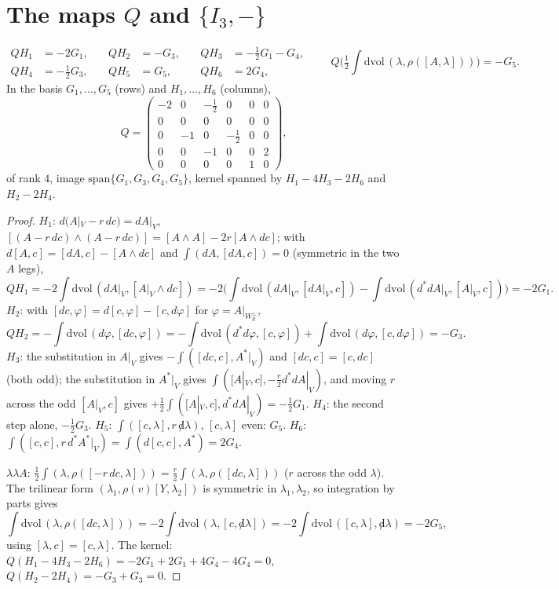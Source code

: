 \section{The maps $Q$ and $\{I_3,-\}$}

\begin{proposition}
\label{prop:s2c-QH}
\[
\begin{aligned}
QH_1&=-2G_1,&\quad QH_2&=-G_3,&\quad QH_3&=-\tfrac12G_1-G_4,\\
QH_4&=-\tfrac12G_3,&\quad QH_5&=G_5,&\quad QH_6&=2G_4,
\end{aligned}
\qquad
Q\Big(\tfrac12\int\mathrm{dvol}\,(\lambda,\rho([A,\lambda]))\Big)=-G_5 .
\]
In the basis $G_1,\dots,G_5$ (rows) and $H_1,\dots,H_6$ (columns),
\[
Q=\begin{pmatrix}-2&0&-\tfrac12&0&0&0\\0&0&0&0&0&0\\0&-1&0&-\tfrac12&0&0\\0&0&-1&0&0&2\\0&0&0&0&1&0\end{pmatrix},
\]
of rank $4$, image $\mathrm{span}\{G_1,G_3,G_4,G_5\}$, kernel spanned by $H_1-4H_3-2H_6$ and $H_2-2H_4$.
\end{proposition}

\begin{proof}
$H_1$: $d(A|_V-r\,dc)=dA|_V$, $[(A-r\,dc)\wedge(A-r\,dc)]=[A\wedge A]-2r[A\wedge dc]$; with $d[A,c]=[dA,c]-[A\wedge dc]$ and $\int(dA,[dA,c])=0$ (symmetric in the two $A$ legs),
\[
QH_1=-2\int\mathrm{dvol}\,(dA|_V,[A|_V\wedge dc])=-2\Big(\int\mathrm{dvol}\,(dA|_V,[dA|_V,c])-\int\mathrm{dvol}\,(d^*dA|_V,[A|_V,c])\Big)=-2G_1 .
\]
$H_2$: with $[dc,\varphi]=d[c,\varphi]-[c,d\varphi]$ for $\varphi=A|_{W_{\mathbb R}^\perp}$,
\[
QH_2=-\int\mathrm{dvol}\,(d\varphi,[dc,\varphi])=-\int\mathrm{dvol}\,(d^*d\varphi,[c,\varphi])+\int\mathrm{dvol}\,(d\varphi,[c,d\varphi])=-G_3 .
\]
$H_3$: the substitution in $A|_V$ gives $-\int([dc,c],A^*|_V)$ and $[dc,c]=[c,dc]$ (both odd); the substitution in $A^*|_V$ gives $\int([A|_V,c],-\tfrac r2d^*dA|_V)$, and moving $r$ across the odd $[A|_V,c]$ gives $+\tfrac12\int([A|_V,c],d^*dA|_V)=-\tfrac12G_1$. $H_4$: the second step alone, $-\tfrac12G_3$. $H_5$: $\int([c,\lambda],r\,{\not d}\lambda)$, $[c,\lambda]$ even: $G_5$. $H_6$: $\int([c,c],r\,d^*A^*|_V)=\int(d[c,c],A^*)=2G_4$.

$\lambda\lambda A$: $\tfrac12\int(\lambda,\rho([-r\,dc,\lambda]))=\tfrac r2\int(\lambda,\rho([dc,\lambda]))$ ($r$ across the odd $\lambda$). The trilinear form $(\lambda_1,\rho(v)[Y,\lambda_2])$ is symmetric in $\lambda_1,\lambda_2$, so integration by parts gives
\[
\int\mathrm{dvol}\,(\lambda,\rho([dc,\lambda]))=-2\int\mathrm{dvol}\,(\lambda,[c,{\not d}\lambda])=-2\int\mathrm{dvol}\,([c,\lambda],{\not d}\lambda)=-2G_5,
\]
using $[\lambda,c]=[c,\lambda]$. The kernel: $Q(H_1-4H_3-2H_6)=-2G_1+2G_1+4G_4-4G_4=0$, $Q(H_2-2H_4)=-G_3+G_3=0$.
\end{proof}

